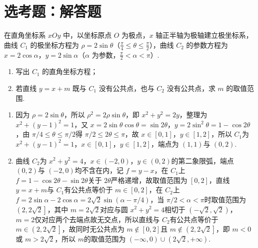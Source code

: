 \section{选考题：解答题}

\begin{problem}
在直角坐标系 \(xOy\) 中，以坐标原点 \(O\) 为极点，\(x\) 轴正半轴为极轴建立极坐标系，曲线 \(C_1\) 的极坐标方程为 \(\rho=2\sin\theta\)（\(\frac{\pi}{4}\le\theta\le\frac{\pi}{2}\)），曲线 \(C_2\) 的参数方程为 \(x=2\cos\alpha\)，\(y=2\sin\alpha\)（\(\alpha\) 为参数，\(\frac{\pi}{2}<\alpha<\pi\)）.

\begin{enumerate}
\item 写出 \(C_1\) 的直角坐标方程；
\item 若直线 \(y=x+m\) 既与 \(C_1\) 没有公共点，也与 \(C_2\) 没有公共点，求 \(m\) 的取值范围.
\end{enumerate}
\end{problem}

\begin{solution}
\begin{enumerate}\item 因为 \(\rho=2\sin\theta\)，所以 \(\rho^{2}=2\rho\sin\theta\)，即 \(x^{2}+y^{2}=2y\)，整理为 \(x^{2}+\left(y-1\right)^{2}=1\)，又 \(x=2\sin\theta\cos\theta=\sin 2\theta\)，\(y=2\sin^{2}\theta=1-\cos 2\theta\)，由 \(\pi/4\le\theta\le\pi/2\)得 \(\pi/2\le 2\theta\le\pi\)，故 \(x\in\left[0,1\right]\)，\(y\in\left[1,2\right]\)，所以 \(C_{1}\)为 \(x^{2}+\left(y-1\right)^{2}=1\)，\(x\in\left[0,1\right]\)，\(y\in\left[1,2\right]\)，端点为 \(\left(1,1\right)\)与 \(\left(0,2\right)\).\item 曲线 \(C_{2}\)为 \(x^{2}+y^{2}=4\)，\(x\in\left(-2,0\right)\)，\(y\in\left(0,2\right)\)的第二象限弧，端点 \(\left(0,2\right)\)与 \(\left(-2,0\right)\)均不含在内，记 \(f=y-x\)，在 \(C_{1}\)上 \(f=1-\cos 2\theta-\sin 2\theta\)关于 \(2\theta\)严格递增，故取值范围为 \(\left[0,2\right]\)，直线 \(y=x+m\)与 \(C_{1}\)有公共点等价于 \(m\in\left[0,2\right]\)，在 \(C_{2}\)上 \(f=2\sin\alpha-2\cos\alpha=2\sqrt{2}\sin\left(\alpha-\pi/4\right)\)，当 \(\pi/2<\alpha<\pi\)时取值范围为 \(\left(2,2\sqrt{2}\right]\)，其中 \(m=2\sqrt{2}\)对应与圆 \(x^{2}+y^{2}=4\)相切于 \(\left(-\sqrt{2},\sqrt{2}\right)\)，\(m=2\)仅对应两个去端点故无交点，所以直线与 \(C_{2}\)有公共点等价于 \(m\in\left(2,2\sqrt{2}\right]\)，故同时无公共点为 \(m\notin\left[0,2\right]\)且 \(m\notin\left(2,2\sqrt{2}\right]\)，即 \(m<0\)或 \(m>2\sqrt{2}\)，所以 \(m\)的取值范围为 \(\left(-\infty,0\right)\cup\left(2\sqrt{2},+\infty\right)\).\end{enumerate}
\end{solution}

